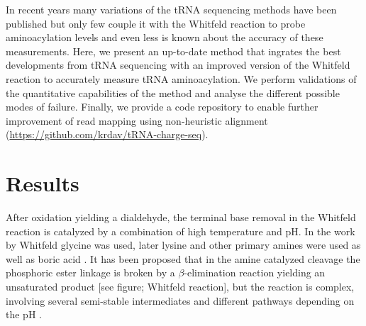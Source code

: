 \documentclass[9pt,lineno]{elife}
\begin{document}
In recent years many variations of the tRNA sequencing methods have been published \citep{Wang2021-fc, Zheng2015-kj, Shigematsu2017-tv, Erber2020-qg, Thomas2021-fi, Lucas2023-vm, Pinkard2020-yd, Warren2021-wt, Yamagami2022-yb} but only few couple it with the Whitfeld reaction to probe aminoacylation levels \citep{Evans2017-st, Behrens2021-gb, Watkins2022-er} and even less is known about the accuracy of these measurements.
Here, we present an up-to-date method that ingrates the best developments from tRNA sequencing with an improved version of the Whitfeld reaction to accurately measure tRNA aminoacylation.
We perform validations of the quantitative capabilities of the method and analyse the different possible modes of failure.
Finally, we provide a code repository to enable further improvement of read mapping using non-heuristic alignment (\url{https://github.com/krdav/tRNA-charge-seq}).



\section{Results}


After oxidation yielding a dialdehyde, the terminal base removal in the Whitfeld reaction is catalyzed by a combination of high temperature and pH.
In the work by Whitfeld \citep{Whitfeld1954-wl} glycine was used, later lysine and other primary amines were used \citep{Khym1961-xf} as well as boric acid \citep{randerath1973sequence}.
It has been proposed that in the amine catalyzed cleavage the phosphoric ester linkage is broken by a $\beta$-elimination reaction \citep{Rammler1971-mt, uziel1973periodate} yielding an unsaturated product [see figure; Whitfeld reaction], but the reaction is complex, involving several semi-stable intermediates and different pathways depending on the pH \citep{Uziel1975-ja}.
\end{document}
